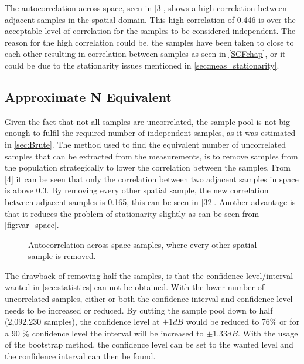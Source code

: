 The autocorrelation across space, seen in \autoref{3}, shows a high correlation between adjacent samples in the spatial domain. This high correlation of 0.446 is over the acceptable level of correlation for the samples to be considered independent. The reason for the high correlation could be, the samples have been taken to close to each other resulting in correlation between samples as seen in \autoref{SCFchap}, or it could be due to the stationarity issues mentioned in \autoref{sec:meas_stationarity}.


\subsection{Approximate N Equivalent}\label{approxN}


Given the fact that not all samples are uncorrelated, the sample pool is not big enough to fulfil the required number of independent samples, as it was estimated in \autoref{sec:Brute}. The method used to find the equivalent number of uncorrelated samples that can be extracted from the measurements, is to remove samples from the population strategically to lower the correlation between the samples. From \autoref{4} it can be seen that only the correlation between two adjacent samples in space is above 0.3. By removing every other spatial sample, the new correlation between adjacent samples is 0.165, this can be seen in \autoref{32}. Another advantage is that it reduces the problem of stationarity slightly as can be seen from \autoref{fig:var_space}.


\begin{figure}[H]
\begin{center}

\caption{Autocorrelation across space samples, where every other spatial sample is removed.}
\label{32}
\end{center}
\end{figure}

The drawback of removing half the samples, is that the confidence level/interval wanted in \autoref{sec:statistics} can not be obtained. With the lower number of uncorrelated samples, either or both the confidence interval and confidence level needs to be increased or reduced. By cutting the sample pool down to half (2,092,230 samples), the confidence level at $\pm 1dB$ would be reduced to 76\% or for a 90 \% confidence level the interval will be increased to $\pm 1.33dB$. With the usage of the bootstrap method, the confidence level can be set to the wanted level and the confidence interval can then be found.


